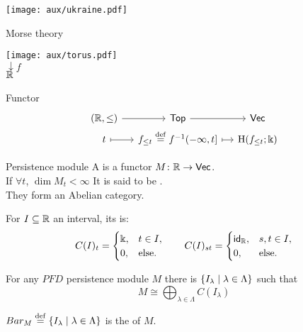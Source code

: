 
\begin{frame}
	\vspace*{2.3cm}
	\begin{center}
		\texttt{[image: aux/ukraine.pdf]}
	\end{center}
\end{frame}

\begin{frame}[fragile]{Morse theory}
	\begin{center}
		\texttt{[image: aux/torus.pdf]} \\
		\medskip
		$\downarrow f$ \\
		\medskip
		$\mathbb{R} \phantom{\ f}$
	\end{center}

	\pause\smallskip

	\begin{block}{Functor}
		\vspace*{-15pt}
		\[
		\begin{tikzcd}[row sep=0, column sep=small]
			(\R, \le) \arrow[r] & \Top \arrow[r] & \Vec \\
			t \arrow[r, mapsto] & f_{\leq t} \defeq f^{-1}(-\infty, t] \arrow[r, mapsto] & \rH(f_{\leq t}; \k)
		\end{tikzcd}
		\]
	\end{block}
\end{frame}

\begin{frame}[fragile]{Persistence module}
	\pause
	A  is a functor $M \colon \mathbb{R} \to \mathsf{Vec}$.\\
	\smallskip\pause
	If $\forall t$, $\dim M_t < \infty$ It is said to be .\\
	\smallskip\pause
	They form an Abelian category.\\
	\medskip\pause

	For $I \subseteq \mathbb{R}$ an interval, its  is:
	\[
	C(I)_t =
	\begin{cases}
		\Bbbk, & t \in I, \\
		0, & \text{else}.
	\end{cases}
	\qquad
	C(I)_{st} =
	\begin{cases}
		\mathsf{id}_{\mathbb{R}}, & s,t \in I, \\
		0, & \text{else}.
	\end{cases}
	\]
	\pause\vskip-5pt
	\begin{theorem}
		For any $PFD$ persistence module $M$ there is $\{I_\lambda \mid \lambda \in \Lambda\}$ such that
		\[
		M \cong \bigoplus_{\lambda \in \Lambda} C(I_\lambda)
		\]
		\pause\vskip-10pt
	\end{theorem}
	\smallskip
	 $Bar_M \stackrel{\mathrm{def}}{=} \{I_\lambda \mid \lambda \in \Lambda\}$ is the  of $M$.
\end{frame}

